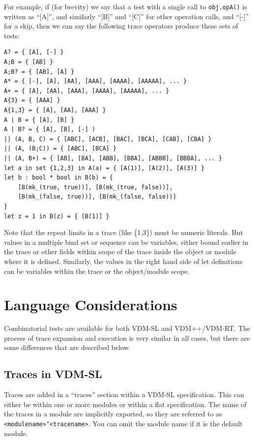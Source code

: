 \documentclass{overturerepchap}
\begin{document}
For example, if (for brevity) we say that a test with a single call to
\texttt{obj.opA()} is written as ``[A]'', and similarly ``[B]'' and ``[C]'' 
for other operation calls, and ``[-]'' for a skip, then we can say the 
following trace operators produce these sets of tests:

\small
\lstset{style=tool,language=}
\begin{lstlisting}[escapechar=@]
A? = { [A], [-] }
A;B = { [AB] }
A;B? = { [AB], [A] }
A* = { [-], [A], [AA], [AAA], [AAAA], [AAAAA], ... }
A+ = { [A], [AA], [AAA], [AAAA], [AAAAA], ... }
A{3} = { [AAA] }
A{1,3} = { [A], [AA], [AAA] }
A | B = { [A], [B] }
A | B? = { [A], [B], [-] )
|| (A, B, C) = { [ABC], [ACB], [BAC], [BCA], [CAB], [CBA] }
|| (A, (B;C)) = { [ABC], [BCA] }
|| (A, B+) = { [AB], [BA], [ABB], [BBA], [ABBB], [BBBA], ... }
let a in set {1,2,3} in A(a) = { [A(1)], [A(2)], [A(3)] }
let b : bool * bool in B(b) = {
    [B(mk_(true, true))], [B(mk_(true, false))],
    [B(mk_(false, true))], [B(mk_(false, false))]
}
let z = 1 in B(z) = { [B(1)] }
\end{lstlisting}
\lstset{style=mystyle}
\lstset{language=VDM++}
\normalsize

Note that the repeat limits in a trace (like \{1,3\}) must be numeric literals.
But values in a multiple bind set or sequence can be variables, either bound
earlier in the trace or other fields within scope of the trace inside the object
or module where it is defined. Similarly, the values in the right hand side of
let definitions can be variables within the trace or the object/module scope.

\section{Language Considerations}

Combinatorial tests are available for both VDM-SL and VDM++/VDM-RT. The process 
of trace expansion and execution is very similar in all cases, but there are
some differences that are described below.

\subsection{Traces in VDM-SL}

Traces are added in a ``traces'' section within a VDM-SL specification. This can
either be within one or more modules or within a flat specification. The name of
the traces in a module are implicitly exported, so they are referred to as
\texttt{<modulename>`<tracename>}. You can omit the module name if it is the
default module.
\end{document}
